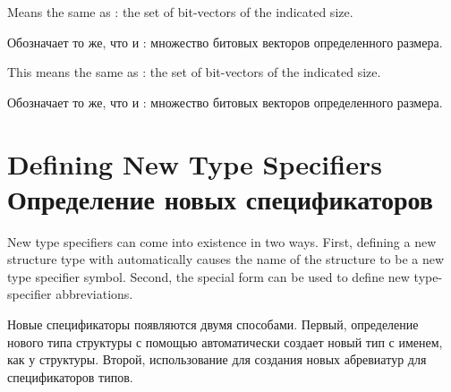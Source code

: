 \begin{flushdesc}
\item[\cd{(bit-vector \emph{size})}]
Means the same as :
the set of bit-vectors of the indicated size.

\item[\cd{(bit-vector \emph{размер})}]
Обозначает то же, что и : множество битовых
векторов определенного размера.

\item[\cd{(simple-bit-vector \emph{size})}]
This means the same as
: the set of bit-vectors of
the indicated size.

\item[\cd{(simple-bit-vector \emph{размер})}]
Обозначает то же, что и : множество битовых
векторов определенного размера.
\end{flushdesc}

\section{Defining New Type Specifiers Определение новых спецификаторов}

New type specifiers can come into existence in two ways.
First, defining a new structure type with  automatically
causes the name of the structure to be a new type specifier symbol.
Second, the  special form can be used to define new type-specifier
abbreviations.

Новые спецификаторы появляются двумя способами.
Первый, определение нового типа структуры с помощью  автоматически
создает новый тип с именем, как у структуры.
Второй, использование  для создания новых абревиатур для
спецификаторов типов.

